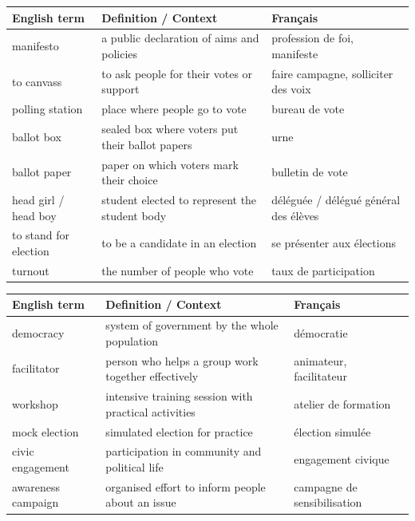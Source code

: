 \documentclass[11pt]{article}
\begin{document}
\begin{definition}
\begin{center}
\begin{tabularx}{\linewidth}{|l|X|l|}\hline
\textbf{English term} & \textbf{Definition / Context} & \textbf{Français} \\ \hline
manifesto & a public declaration of aims and policies & profession de foi, manifeste \\
to canvass & to ask people for their votes or support & faire campagne, solliciter des voix \\
polling station & place where people go to vote & bureau de vote \\
ballot box & sealed box where voters put their ballot papers & urne \\
ballot paper & paper on which voters mark their choice & bulletin de vote \\
head girl / head boy & student elected to represent the student body & déléguée / délégué général des élèves \\
to stand for election & to be a candidate in an election & se présenter aux élections \\
turnout & the number of people who vote & taux de participation \\ \hline
\end{tabularx}
\end{center}
\end{definition}

\begin{definition}
\begin{center}
\begin{tabularx}{\linewidth}{|l|X|l|}\hline
\textbf{English term} & \textbf{Definition / Context} & \textbf{Français} \\ \hline
democracy & system of government by the whole population & démocratie \\
facilitator & person who helps a group work together effectively & animateur, facilitateur \\
workshop & intensive training session with practical activities & atelier de formation \\
mock election & simulated election for practice & élection simulée \\
civic engagement & participation in community and political life & engagement civique \\
awareness campaign & organised effort to inform people about an issue & campagne de sensibilisation \\ \hline
\end{tabularx}
\end{center}
\end{definition}
\end{document}
